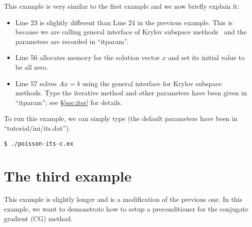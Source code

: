 \documentclass[11pt]{memoir}
\begin{document}
%
This example is very similar to the first example and we now briefly explain it:
\begin{itemize}
%
\item Line 23 is slightly different than Line 24 in the previous example. This is because we are calling general interface of Krylov subspace methods~\cite{Saad.Saad.2003fv} and the parameters are recorded in ``itparam''.
%
\item Line 56 allocates memory for the solution vector $x$ and set its initial value to be all zero.
%
\item Line 57 solves $Ax=b$ using the general interface for Krylov subspace methods. Type the iterative method and other parameters have been given in ``itparam''; see \S\ref{sec:iter} for details.
%
\end{itemize}
%
To run this example, we can simply type (the default parameters have been in ``tutorial/ini/its.dat'').
%
\begin{lstlisting}[numbers=none]
$ ./poisson-its-c.ex
\end{lstlisting}

\section{The third example}\label{sec:ex3}

This example is slightly longer and is a modification of the previous one. In this example,  we want to demonstrate how to setup a preconditioner for the conjugate gradient (CG) method.
\end{document}
